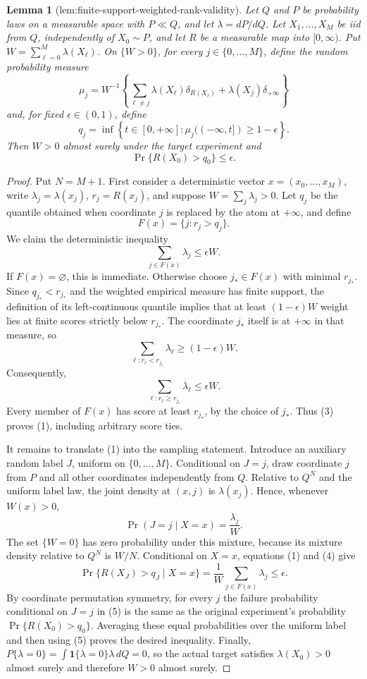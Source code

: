 \documentclass{article}
\newtheorem{lemma}{Lemma}
\begin{document}
\begin{lemma}[lem:finite-support-weighted-rank-validity]\label{lem:finite-support-weighted-rank-validity}
Let \(Q\) and \(P\) be probability laws on a measurable space with \(P\ll Q\), and let \(\lambda=dP/dQ\). Let \(X_1,\ldots,X_M\) be iid from \(Q\), independently of \(X_0\sim P\), and let \(R\) be a measurable map into \([0,\infty)\). Put \(W=\sum_{\ell=0}^M\lambda(X_\ell)\). On \(\{W>0\}\), for every \(j\in\{0,\ldots,M\}\), define the random probability measure \[\mu_j=W^{-1}\left\{\sum_{\ell\ne j}\lambda(X_\ell)\delta_{R(X_\ell)}+\lambda(X_j)\delta_{+\infty}\right\}\] and, for fixed \(\epsilon\in(0,1)\), define \[q_j=\inf\left\{t\in[0,+\infty]:\mu_j((-\infty,t])\ge1-\epsilon\right\}.\] Then \(W>0\) almost surely under the target experiment and \[\Pr\{R(X_0)>q_0\}\le\epsilon.\]
\end{lemma}
\begin{proof}
Put \(N=M+1\). First consider a deterministic vector \(x=(x_0,\ldots,x_M)\), write \(\lambda_j=\lambda(x_j)\), \(r_j=R(x_j)\), and suppose \(W=\sum_j\lambda_j>0\). Let \(q_j\) be the quantile obtained when coordinate \(j\) is replaced by the atom at \(+\infty\), and define
\[
F(x)=\{j:r_j>q_j\}.
\]
We claim the deterministic inequality
\[
\sum_{j\in F(x)}\lambda_j\le\epsilon W.
\tag{1}
\]
If \(F(x)=\varnothing\), this is immediate. Otherwise choose \(j_*\in F(x)\) with minimal \(r_{j_*}\). Since \(q_{j_*}<r_{j_*}\) and the weighted empirical measure has finite support, the definition of its left-continuous quantile implies that at least \((1-\epsilon)W\) weight lies at finite scores strictly below \(r_{j_*}\). The coordinate \(j_*\) itself is at \(+\infty\) in that measure, so
\[
\sum_{\ell:r_\ell<r_{j_*}}\lambda_\ell\ge(1-\epsilon)W.
\tag{2}
\]
Consequently,
\[
\sum_{\ell:r_\ell\ge r_{j_*}}\lambda_\ell\le\epsilon W.
\tag{3}
\]
Every member of \(F(x)\) has score at least \(r_{j_*}\), by the choice of \(j_*\). Thus (3) proves (1), including arbitrary score ties.

It remains to translate (1) into the sampling statement. Introduce an auxiliary random label \(J\), uniform on \(\{0,\ldots,M\}\). Conditional on \(J=j\), draw coordinate \(j\) from \(P\) and all other coordinates independently from \(Q\). Relative to \(Q^N\) and the uniform label law, the joint density at \((x,j)\) is \(\lambda(x_j)\). Hence, whenever \(W(x)>0\),
\[
\Pr(J=j\mid X=x)=\frac{\lambda_j}{W}.
\tag{4}
\]
The set \(\{W=0\}\) has zero probability under this mixture, because its mixture density relative to \(Q^N\) is \(W/N\). Conditional on \(X=x\), equations (1) and (4) give
\[
\Pr\{R(X_J)>q_J\mid X=x\}=\frac1W\sum_{j\in F(x)}\lambda_j\le\epsilon.
\tag{5}
\]
By coordinate permutation symmetry, for every \(j\) the failure probability conditional on \(J=j\) in (5) is the same as the original experiment's probability \(\Pr\{R(X_0)>q_0\}\). Averaging these equal probabilities over the uniform label and then using (5) proves the desired inequality. Finally, \(P\{\lambda=0\}=\int\mathbf 1\{\lambda=0\}\lambda\,dQ=0\), so the actual target satisfies \(\lambda(X_0)>0\) almost surely and therefore \(W>0\) almost surely.
\end{proof}
\end{document}
